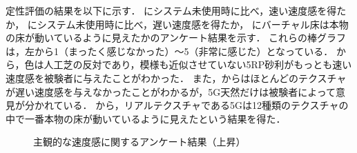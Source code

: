 定性評価の結果を以下に示す．
にシステム未使用時に比べ，速い速度感を得たか，
にシステム未使用時に比べ，遅い速度感を得たか，
にバーチャル床は本物の床が動いているように見えたかのアンケート結果を示す．
これらの棒グラフは，左から1（まったく感じなかった）～5（非常に感じた）となっている．
から，色は人工芝の反対であり，模様も近似させていない5RP砂利がもっとも速い速度感を被験者に与えたことがわかった．
また，からはほとんどのテクスチャが遅い速度感を与えなかったことがわかるが，5G天然だけは被験者によって意見が分かれている．
から，リアルテクスチャである5Gは12種類のテクスチャの中で一番本物の床が動いているように見えたという結果を得た．
\begin{figure}[H]
    \centering
    \caption{主観的な速度感に関するアンケート結果（上昇）}
    \label{fig:anke1}
\end{figure}


